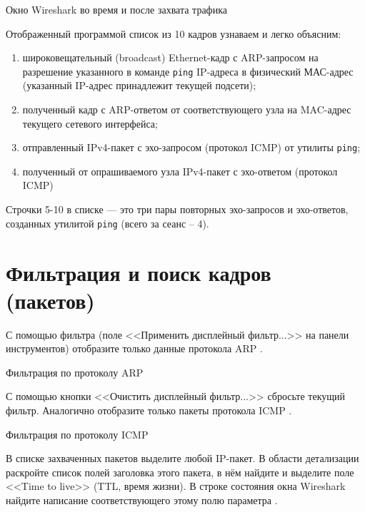 \begin{image}
	\caption{Окно Wireshark во время и после захвата трафика}
	\label{fig:wrsh:ping}
\end{image}

Отображенный программой список из 10 кадров узнаваем и легко объясним:

\begin{enumerate}
	\item широковещательный (broadcast)
		Ethernet-кадр с ARP-запросом на разрешение указанного
		в команде \texttt{ping} IP-адреса в физический МАС-адрес
		(указанный IP-адрес принадлежит текущей подсети);
	\item полученный кадр с ARP-ответом от соответствующего узла
		на MAC-адрес текущего сетевого интерфейса;
	\item отправленный IPv4-пакет с эхо-запросом (протокол ICMP)
		от утилиты \texttt{ping};
	\item полученный от опрашиваемого узла IPv4-пакет с эхо-ответом
		(протокол ICMP)
\end{enumerate}

Строчки 5-10 в списке --- это три пары повторных эхо-запросов и эхо-ответов,
созданных утилитой \texttt{ping} (всего за сеанс – 4).

\section{Фильтрация и поиск кадров (пакетов)}

С помощью фильтра
(поле <<Применить дисплейный фильтр...>> на панели инструментов)
отобразите только данные протокола ARP .

\begin{image}
	\caption{Фильтрация по протоколу ARP}
	\label{fig:wrsh:filter:arp}
\end{image}

С помощью кнопки <<Очистить дисплейный фильтр...>> сбросьте текущий фильтр.
Аналогично отобразите только пакеты протокола ICMP .

\begin{image}
	\caption{Фильтрация по протоколу ICMP}
	\label{fig:wrsh:filter:icmp}
\end{image}

В списке захваченных пакетов выделите любой IP-пакет.
В области детализации раскройте список полей заголовка этого пакета,
в нём найдите и выделите поле <<Time to live>> (TTL, время жизни).
В строке состояния окна Wireshark найдите написание соответствующего
этому полю параметра .

